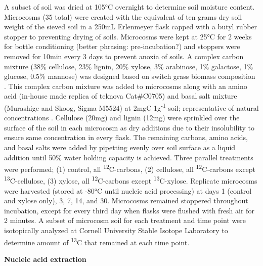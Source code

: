 A subset of soil was dried at 105°C overnight to determine soil moisture content. Microcosms (35 total) were created with the equivalent of ten grams dry soil weight of the sieved soil in a 250mL Erlenmeyer flask capped with a butyl rubber stopper to preventing drying of soils.  Microcosms were kept at 25°C for 2 weeks for bottle conditioning (better phrasing: pre-incubation?) and stoppers were removed for 10min every 3 days to prevent anoxia of soils. A complex carbon mixture (38\% cellulose, 23\% lignin, 20\% xylose, 3\% arabinose, 1\% galactose, 1\% glucose, 0.5\% mannose) was designed based on switch grass biomass composition \cite{Yan_2010,David_2010}.  This complex carbon mixture was added to microcosms along with an amino acid (in-house made replica of teknova Cat#C0705) and basal salt mixture (Murashige and Skoog, Sigma M5524) at 2mgC 1g\textsuperscript{-1} soil; representative of natural concentrations \cite{Schneckenberger_2008}.  Cellulose (20mg) and lignin (12mg) were sprinkled over the surface of the soil in each microcosm as dry additions due to their insolubility to ensure same concentration in every flask. The remaining carbons, amino acids, and basal salts were added by pipetting evenly over soil surface as a liquid addition until 50\% water holding capacity is achieved.  Three parallel treatments were performed; (1) control, all \textsuperscript{12}C-carbons, (2) cellulose, all \textsuperscript{12}C-carbons except \textsuperscript{13}C-cellulose, (3) xylose, all \textsuperscript{12}C-carbons except \textsuperscript{13}C-xylose.  Replicate microcosms were harvested (stored at -80°C until nucleic acid processing) at days 1 (control and xylose only), 3, 7, 14, and 30.  Microcosms remained stoppered throughout incubation, except for every third day when flasks were flushed with fresh air for 2 minutes.  A subset of microcosm soil for each treatment and time point were isotopically analyzed at Cornell University Stable Isotope Laboratory to determine amount of \textsuperscript{13}C that remained at each time point.                       



\textbf{Nucleic acid extraction}

